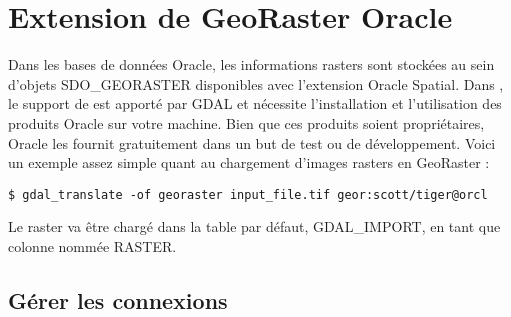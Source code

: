 \section{Extension de GeoRaster Oracle}


Dans les bases de données Oracle, les informations rasters sont stockées au sein d'objets SDO\_GEORASTER disponibles avec l'extension Oracle Spatial. Dans \qg, le support de  est apporté par GDAL et nécessite l'installation et l'utilisation des produits Oracle sur votre machine. Bien que ces produits soient propriétaires, Oracle les fournit gratuitement dans un but de test ou de développement. Voici un exemple assez simple quant au chargement d'images rasters en GeoRaster :

\begin{verbatim} 
$ gdal_translate -of georaster input_file.tif geor:scott/tiger@orcl
\end{verbatim}

Le raster va être chargé dans la table par défaut, GDAL\_IMPORT, en tant que colonne nommée RASTER.

\subsection{Gérer les connexions}


